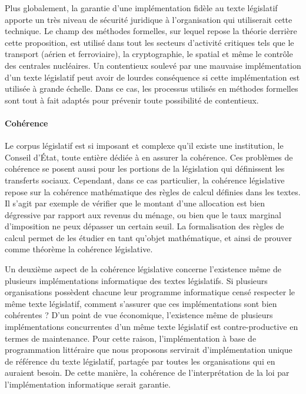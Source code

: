 \documentclass[11pt, french]{article}
\begin{document}
Plus globalement, la garantie d'une implémentation fidèle au texte législatif apporte un très niveau
de sécurité juridique à l'organisation qui utiliserait cette technique. Le champ des méthodes
formelles, sur lequel repose la théorie derrière cette proposition, est utilisé dans tout les
secteurs d'activité critiques tels que le transport (aérien et ferroviaire), la cryptographie,
le spatial et même le contrôle des centrales nucléaires. Un contentieux
soulevé par une mauvaise implémentation d'un texte législatif peut avoir de lourdes
conséquence si cette implémentation est utilisée à grande échelle. Dans ce cas, les processus
utilisés en méthodes formelles sont tout à fait adaptés pour prévenir toute
possibilité de contentieux.

\paragraph{Cohérence} Le corpus législatif est si imposant et complexe qu'il existe une institution,
le Conseil d'État, toute entière dédiée à en assurer la cohérence. Ces problèmes de cohérence se
posent aussi pour les portions de la législation qui définissent les transferts sociaux. Cependant,
dans ce cas particulier, la cohérence législative repose sur la cohérence mathématique des règles
de calcul définies dans les textes. Il s'agit par exemple de vérifier que le montant d'une allocation
est bien dégressive par rapport aux revenus du ménage, ou bien que le taux marginal d'imposition
ne peux dépasser un certain seuil. La formalisation des règles de calcul permet de les étudier
en tant qu'objet mathématique, et ainsi de prouver comme théorème la cohérence législative.

Un deuxième aspect de la cohérence législative concerne l'existence même de plusieurs implémentations
informatique des textes législatifs. Si plusieurs organisations possèdent chacune leur programme
informatique censé respecter le même texte législatif, comment s'assurer que ces implémentations
sont bien cohérentes ? D'un point de vue économique, l'existence même de plusieurs implémentations
concurrentes d'un même texte législatif est contre-productive en termes de maintenance. Pour cette
raison, l'implémentation à base de programmation littéraire que nous proposons servirait d'implémentation
unique de référence du texte législatif, partagée par toutes les organisations qui en auraient besoin.
De cette manière, la cohérence de l'interprétation de la loi par l'implémentation informatique
serait garantie.
\end{document}
